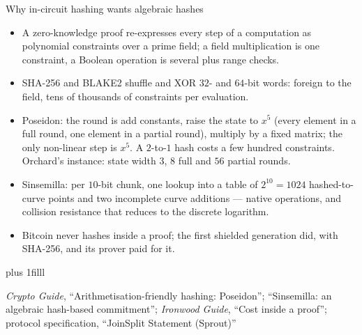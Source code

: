\documentclass[aspectratio=169,11pt]{beamer}
\newcommand{\src}[1]{\par\vskip0pt plus 1filll
  {\fontsize{6}{7.2}\selectfont\color{arbdim}\raggedright #1\par}}
\begin{document}
\begin{frame}{Why in-circuit hashing wants algebraic hashes}
\begin{itemize}
  \item A zero-knowledge proof re-expresses every step of a computation as
    polynomial constraints over a prime field; a field multiplication is
    one constraint, a Boolean operation is several plus range checks.
  \item SHA-256 and BLAKE2 shuffle and XOR $32$- and $64$-bit words:
    foreign to the field, tens of thousands of constraints per evaluation.
  \item Poseidon: the round is add constants, raise the state to $x^{5}$
    (every element in a full round, one element in a partial round),
    multiply by a fixed matrix; the only non-linear step is $x^{5}$. A
    $2$-to-$1$ hash costs a few hundred constraints. Orchard's instance:
    state width $3$, $8$ full and $56$ partial rounds.
  \item Sinsemilla: per $10$-bit chunk, one lookup into a table of
    $2^{10} = 1024$ hashed-to-curve points and two incomplete curve
    additions --- native operations, and collision resistance that reduces
    to the discrete logarithm.
  \item Bitcoin never hashes inside a proof; the first shielded generation
    did, with SHA-256, and its prover paid for it.
\end{itemize}
\src{\emph{Crypto Guide}, ``Arithmetisation-friendly hashing: Poseidon'';
  ``Sinsemilla: an algebraic hash-based commitment''; \emph{Ironwood Guide},
  ``Cost inside a proof''; protocol specification, ``JoinSplit Statement
  (Sprout)''}
\end{frame}
\end{document}
